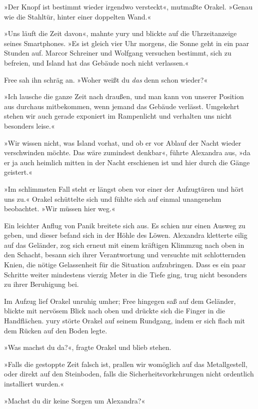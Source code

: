 »Der Knopf ist bestimmt wieder irgendwo versteckt«, mutmaßte Orakel. »Genau wie die Stahltür, hinter einer doppelten Wand.«

»Uns läuft die Zeit davon«, mahnte yury und blickte auf die Uhrzeitanzeige seines Smartphones. »Es ist gleich vier Uhr morgens, die Sonne geht in ein paar Stunden auf. Marcor Schreiner und Wolfgang versuchen bestimmt, sich zu befreien, und Island hat das Gebäude noch nicht verlassen.«

Free sah ihn schräg an. »Woher weißt du \emph{das} denn schon wieder?«

»Ich lausche die ganze Zeit nach draußen, und man kann von unserer Position aus durchaus mitbekommen, wenn jemand das Gebäude verlässt. Umgekehrt stehen wir auch gerade exponiert im Rampenlicht und verhalten uns nicht besonders leise.«

»Wir wissen nicht, was Island vorhat, und ob er vor Ablauf der Nacht wieder verschwinden möchte. Das wäre zumindest denkbar«, führte Alexandra aus, »da er ja auch heimlich mitten in der Nacht erschienen ist und hier durch die Gänge geistert.«

»Im schlimmsten Fall steht er längst oben vor einer der Aufzugtüren und hört uns zu.« Orakel schüttelte sich und fühlte sich auf einmal unangenehm beobachtet. »Wir müssen hier weg.«

Ein leichter Anflug von Panik breitete sich aus. Es schien nur einen Ausweg zu geben, und dieser befand sich in der Höhle des Löwen. Alexandra kletterte eilig auf das Geländer, zog sich erneut mit einem kräftigen Klimmzug nach oben in den Schacht, besann sich ihrer Verantwortung und versuchte mit schlotternden Knien, die nötige Gelassenheit für die Situation aufzubringen. Dass es ein paar Schritte weiter mindestens vierzig Meter in die Tiefe ging, trug nicht besonders zu ihrer Beruhigung bei.

Im Aufzug lief Orakel unruhig umher; Free hingegen saß auf dem Geländer, blickte mit nervösem Blick nach oben und drückte sich die Finger in die Handflächen. yury störte Orakel auf seinem Rundgang, indem er sich flach mit dem Rücken auf den Boden legte.

»Was machst du da?«, fragte Orakel und blieb stehen.

»Falls die gestoppte Zeit falsch ist, prallen wir womöglich auf das Metallgestell, oder direkt auf den Steinboden, falls die Sicherheitsvorkehrungen nicht ordentlich installiert wurden.«

»Machst du dir keine Sorgen um Alexandra?«

